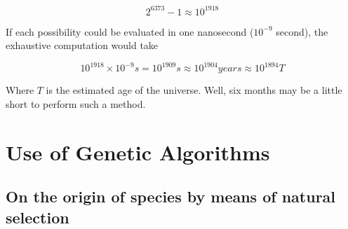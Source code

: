 \documentclass{report}
\begin{document}
	\begin{equation}
	2^{6373} - 1 \approx 10^{1918}
	\end{equation}
	
	If each possibility could be evaluated in one nanosecond ($10^{-9}$ second), the exhaustive computation would take 
	
	\begin{equation}
	10^{1918} \times 10^{-9} s = 10^{1909} s \approx 10^{1904} years \approx 10^{1894} T
	\end{equation}
	
	Where $T$ is the estimated age of the universe. Well, six months may be a little short to perform such a method.
	
	\chapter{Use of Genetic Algorithms}
	
	\section{On the origin of species by means of natural selection}
	
\end{document}
